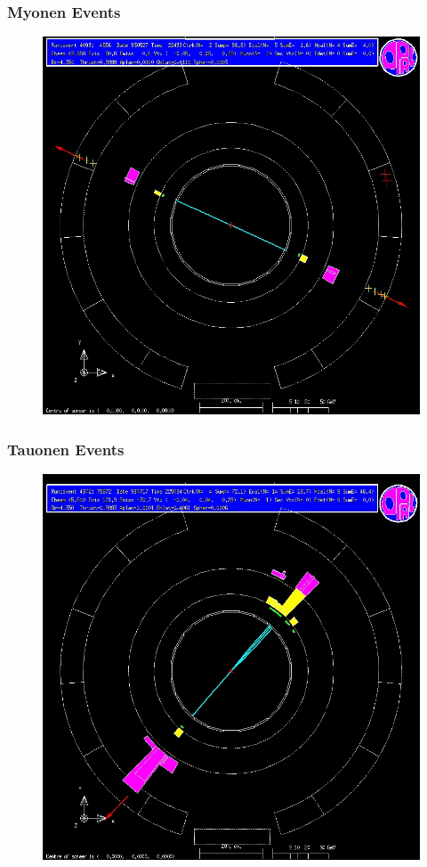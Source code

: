 \begin{frame}
	\frametitle{Myonen Events}
	\begin{figure}
		\centering
		\includegraphics[width=0.63\linewidth]{graphics/muonopal}
	\end{figure}
	
\end{frame}
\begin{frame}
	\frametitle{Tauonen Events}
	\begin{figure}
		\centering
		\includegraphics[width=0.63\linewidth]{graphics/tauonopal}
	\end{figure}
	
\end{frame}
